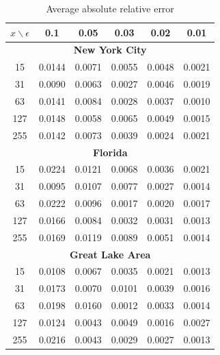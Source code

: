 \begin{table}[ht!]
  \centering
  \begin{tabular}{|c|c|c|c|c|c|}
    \hline
    $x \backslash \epsilon$ & 0.1 & 0.05 & 0.03 & 0.02 & 0.01 \\ \hline
    \multicolumn{6}{|c|}{\textbf{New York City}} \\ \hline
    15 & 0.0144 & 0.0071 & 0.0055 & 0.0048 & 0.0021 \\ \hline
    31 & 0.0090 & 0.0063 & 0.0027 & 0.0046 & 0.0019 \\ \hline
    63 & 0.0141 & 0.0084 & 0.0028 & 0.0037 & 0.0010 \\ \hline
    127 & 0.0148 & 0.0058 & 0.0065 & 0.0049 & 0.0015 \\ \hline
    255 & 0.0142 & 0.0073 & 0.0039 & 0.0024 & 0.0021 \\ \hline
    \multicolumn{6}{|c|}{\textbf{Florida}} \\ \hline
    15 & 0.0224 & 0.0121 & 0.0068 & 0.0036 & 0.0021 \\ \hline
    31 & 0.0095 & 0.0107 & 0.0077 & 0.0027 & 0.0014 \\ \hline
    63 & 0.0222 & 0.0096 & 0.0017 & 0.0020 & 0.0017 \\ \hline
    127 & 0.0166 & 0.0084 & 0.0032 & 0.0031 & 0.0013 \\ \hline
    255 & 0.0169 & 0.0119 & 0.0089 & 0.0051 & 0.0014 \\ \hline
    \multicolumn{6}{|c|}{\textbf{Great Lake Area}} \\ \hline
    15 & 0.0108 & 0.0067 & 0.0035 & 0.0021 & 0.0013 \\ \hline
    31 & 0.0173 & 0.0070 & 0.0101 & 0.0039 & 0.0016 \\ \hline
    63 & 0.0198 & 0.0160 & 0.0012 & 0.0033 & 0.0014 \\ \hline
    127 & 0.0124 & 0.0043 & 0.0049 & 0.0016 & 0.0027 \\ \hline
    255 & 0.0216 & 0.0043 & 0.0029 & 0.0027 & 0.0013 \\ \hline
  \end{tabular}
  \caption{Average absolute relative error}
\end{table}

